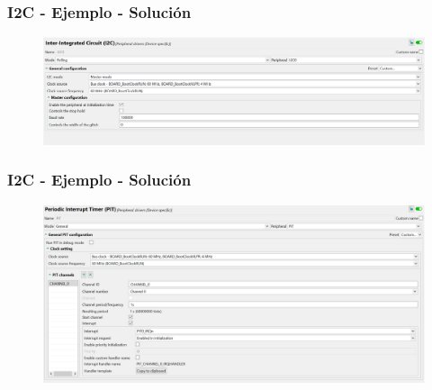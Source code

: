 \documentclass[10.5pt,scale=1.0,t,aspectratio=169,hyperref={pdfpagelabels=false}]{beamer}
\begin{document}
\begin{frame}
	\frametitle{I2C - Ejemplo - Solución}
	\begin{figure}
		\centering
		\includegraphics[scale=0.35]{32_I2CSetup}
	\end{figure}
\end{frame}

\begin{frame}
	\frametitle{I2C - Ejemplo - Solución}
	\begin{figure}
		\centering
		\includegraphics[scale=0.35]{33_PITConfig}
	\end{figure}
\end{frame}
\end{document}
